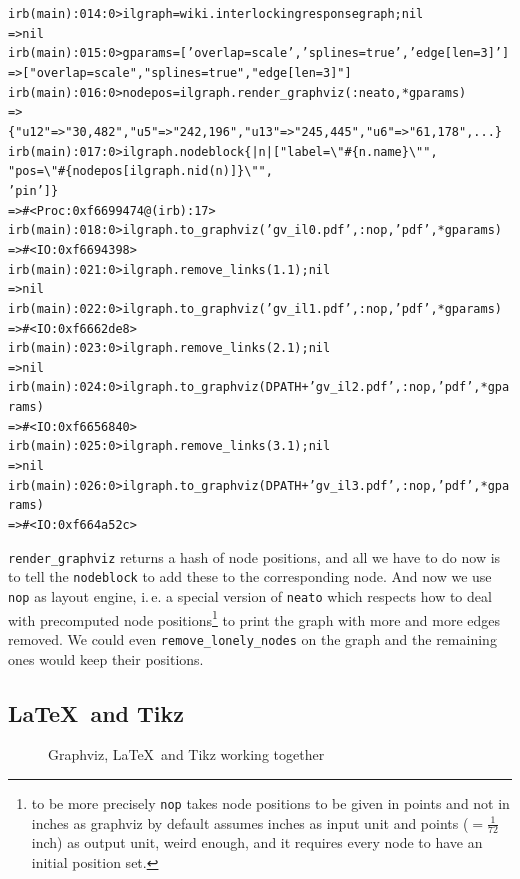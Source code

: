 \documentclass[a4paper]{scrartcl}
\newcounter{tcounter}
\newcommand{\tcount}{\makebox[0pt][r]{\tiny\thetcounter~}}
\newenvironment{typed}{\refstepcounter{tcounter}\bgroup\setlength{\topsep}{0pt}\renewcommand{\FrameCommand}[1]{\fcolorbox{black!30}{bgcolor}{##1}\tcount}\MakeFramed{\FrameRestore}\begin{alltt}\small}{\end{alltt}\endMakeFramed\egroup\par\aftergroup\noindent\aftergroup\ignorespaces}
\newcommand{\cmd}[1]{\texttt{\color{cmd}#1}}
\newcommand{\p}{\textcolor{prompt}}
\renewcommand{\c}{\textcolor{cmd}}
\begin{document}
\begin{typed}
\p{irb(main):014:0>} \c{ilgraph = wiki.interlockingresponsegraph; nil}
=> nil
\p{irb(main):015:0>} \c{gparams = ['overlap=scale', 'splines=true', 'edge [len=3]']}
=> ["overlap=scale", "splines=true", "edge [len=3]"]
\p{irb(main):016:0>} \c{nodepos = ilgraph.render_graphviz(:neato, *gparams)}
=> \{"u12"=>"30,482", "u5"=>"242,196", "u13"=>"245,445", "u6"=>"61,178", ...\}
\p{irb(main):017:0>} \c{ilgraph.nodeblock \{ |n| ["label=\textbackslash"#\{n.name\}\textbackslash"", 
                                          "pos=\textbackslash"#\{nodepos[ilgraph.nid(n)]\}\textbackslash"", 
                                          'pin'] \}}
=> #<Proc:0xf6699474@(irb):17>
\p{irb(main):018:0>} \c{ilgraph.to_graphviz('gv_il0.pdf', :nop, 'pdf', *gparams)}
=> #<IO:0xf6694398>
\p{irb(main):021:0>} \c{ilgraph.remove_links(1.1); nil}
=> nil
\p{irb(main):022:0>} \c{ilgraph.to_graphviz('gv_il1.pdf', :nop, 'pdf', *gparams)}
=> #<IO:0xf6662de8>
\p{irb(main):023:0>} \c{ilgraph.remove_links(2.1); nil}
=> nil
\p{irb(main):024:0>} \c{ilgraph.to_graphviz(DPATH+'gv_il2.pdf', :nop, 'pdf', *gparams)}
=> #<IO:0xf6656840>
\p{irb(main):025:0>} \c{ilgraph.remove_links(3.1); nil}
=> nil
\p{irb(main):026:0>} \c{ilgraph.to_graphviz(DPATH+'gv_il3.pdf', :nop, 'pdf', *gparams)}
=> #<IO:0xf664a52c>
\end{typed}
\cmd{render\_graphviz} returns a hash of node positions, and all we
have to do now is to tell the \cmd{nodeblock} to add these to the
corresponding node. And now we use \cmd{nop} as layout engine,
i.\,e. a special version of \cmd{neato} which respects how to deal
with precomputed node positions\footnote{to be more precisely
  \cmd{nop} takes node positions to be given in points and not in
  inches as graphviz by default assumes inches as input unit and
  points ($=\frac{1}{72}$ inch) as output unit, weird enough, and it
  requires every node to have an initial position set.} to print the
graph with more and more edges removed. We could even
\cmd{remove\_lonely\_nodes} on the graph and the remaining ones would
keep their positions.

\subsection{\LaTeX\ and Tikz}
\label{sec:tikz}

\begin{figure}
  \centering\vspace{-3ex}
  
  \caption{Graphviz, \LaTeX\ and Tikz working together}
  \label{fig:tikz_ca}
\end{figure}
\end{document}
